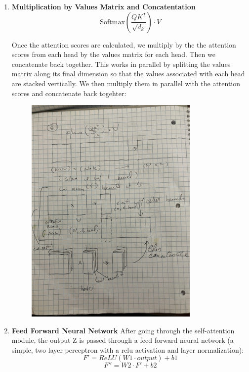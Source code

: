 \documentclass[12pt]{article}
\begin{document}
\begin{enumerate}
\item \textbf{Multiplication by Values Matrix and Concatentation} 
\[\text{Softmax}\left(\frac{QK^T}{\sqrt{d_k}}\right)\cdot V\]

Once the attention scores are calculated, we multiply by the the attention scores from each head by the values matrix for each head. Then we concatenate back together. This works in parallel by splitting the values matrix along its final dimension so that the values associated with each head are stacked vertically. We then multiply them in parallel with the attention scores and concatenate back togehter: 
\begin{figure}[H]
    \centering
    \includegraphics[width=0.8\textwidth, angle=270]{./attention_v_calc.jpg}
\end{figure}
\item \textbf{Feed Forward Neural Network} After going through the self-attention module, the output Z is passed through a feed forward neural network (a simple, two layer perceptron with a relu activation and layer normalization):
\[F' = ReLU(W1 \cdot output) + b1\]
\[F'' = W2 \cdot F' + b2\]


\end{enumerate}
\end{document}
